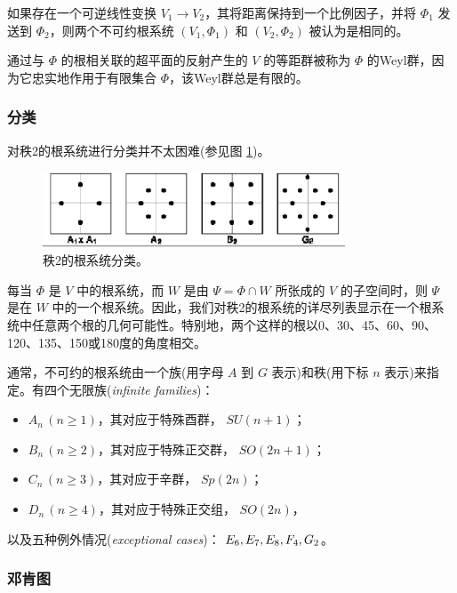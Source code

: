 \documentclass[11pt,fontset=founder]{ctexart}
\begin{document}
如果存在一个可逆线性变换 $ V_1\rightarrow V_2 $，其将距离保持到一个比例因子，并将 $\Phi _{\mathrm{1}}$ 发送到 $\Phi _{\mathrm{2}}$，则两个不可约根系统 $(V_1,\Phi _1)$ 和 $(V_ 2,\Phi _2)$ 被认为是相同的。

通过与 $\Phi $ 的根相关联的超平面的反射产生的 $V$ 的等距群被称为 $\Phi $ 的Weyl群，因为它忠实地作用于有限集合 $\Phi $，该Weyl群总是有限的。

\subsubsection{分类}

对秩2的根系统进行分类并不太困难(参见图 \ref{Root})。

\begin{figure}[tbh]
\centerline{\includegraphics[width=9cm]{Root}}
\caption{秩2的根系统分类。}
\label{Root}
\end{figure}

每当 $\Phi $ 是 $V$ 中的根系统，而 $W$ 是由 $\Psi =\Phi \cap W$ 所张成的 $V$ 的子空间时，则 $\Psi $ 是在 $W$ 中的一个根系统。因此，我们对秩2的根系统的详尽列表显示在一个根系统中任意两个根的几何可能性。特别地，两个这样的根以0、30、45、60、90、120、135、150或180度的角度相交。

通常，不可约的根系统由一个族(用字母 $A$ 到 $G$ 表示)和秩(用下标 $n$ 表示)来指定。有四个无限族(\emph{infinite families})：

\begin{itemize}
\item $A_{n}\,(n\geq 1)$，其对应于特殊酉群， $%
SU(n+1)$；

\item $B_{n}\,(n\geq 2)$，其对应于特殊正交群，
$SO(2n+1)$；

\item $C_{n}\,(n\geq 3)$，其对应于辛群， $Sp(2n)
$；

\item $D_{n}\,(n\geq 4)$，其对应于特殊正交组，
$SO(2n)$，
\end{itemize}

以及五种例外情况(\emph{exceptional cases})： $E_{\mathrm{6}},E_{\mathrm{7}},E_{%
\mathrm{8}},F_{\mathrm{4}},G_{\mathrm{2}}$。

\subsubsection{邓肯图}
\end{document}
